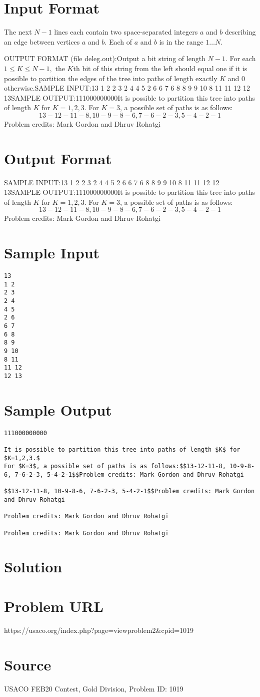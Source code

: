 \documentclass[12pt]{article}
\begin{document}
\section*{Input Format}
The next $N-1$ lines each contain two space-separated integers $a$ and $b$
describing an edge between vertices $a$ and $b$.  Each of $a$ and $b$ is in the
range $1 \ldots N$.

OUTPUT FORMAT (file deleg.out):Output a bit string of length $N-1.$ For each $1\le K\le N-1,$ the $K$th bit of
this string from the left should equal one if it is possible to partition the edges of the
tree into paths of length exactly $K$ and $0$ otherwise.SAMPLE INPUT:13
1 2
2 3
2 4
4 5
2 6
6 7
6 8
8 9
9 10
8 11
11 12
12 13SAMPLE OUTPUT:111000000000It is possible to partition this tree into paths of length $K$ for $K=1,2,3.$
For $K=3$, a possible set of paths is as follows:$$13-12-11-8, 10-9-8-6, 7-6-2-3, 5-4-2-1$$Problem credits: Mark Gordon and Dhruv Rohatgi

\section*{Output Format}
SAMPLE INPUT:13
1 2
2 3
2 4
4 5
2 6
6 7
6 8
8 9
9 10
8 11
11 12
12 13SAMPLE OUTPUT:111000000000It is possible to partition this tree into paths of length $K$ for $K=1,2,3.$
For $K=3$, a possible set of paths is as follows:$$13-12-11-8, 10-9-8-6, 7-6-2-3, 5-4-2-1$$Problem credits: Mark Gordon and Dhruv Rohatgi

\section*{Sample Input}
\begin{verbatim}
13
1 2
2 3
2 4
4 5
2 6
6 7
6 8
8 9
9 10
8 11
11 12
12 13
\end{verbatim}

\section*{Sample Output}
\begin{verbatim}
111000000000

It is possible to partition this tree into paths of length $K$ for $K=1,2,3.$
For $K=3$, a possible set of paths is as follows:$$13-12-11-8, 10-9-8-6, 7-6-2-3, 5-4-2-1$$Problem credits: Mark Gordon and Dhruv Rohatgi

$$13-12-11-8, 10-9-8-6, 7-6-2-3, 5-4-2-1$$Problem credits: Mark Gordon and Dhruv Rohatgi

Problem credits: Mark Gordon and Dhruv Rohatgi

Problem credits: Mark Gordon and Dhruv Rohatgi
\end{verbatim}

\section*{Solution}


\section*{Problem URL}
https://usaco.org/index.php?page=viewproblem2&cpid=1019

\section*{Source}
USACO FEB20 Contest, Gold Division, Problem ID: 1019
\end{document}
